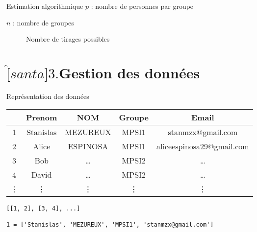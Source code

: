 \documentclass[10pt, compress]{beamer}
\begin{document}
  \begin{frame}{Estimation algorithmique}
    $p$ : nombre de personnes par groupe 
    
    $n$ : nombre de groupes
    \begin{figure}
      \caption{Nombre de tirages possibles}
    \end{figure}
  \end{frame}

\section{$\hat[santa]{\text{3.}}$\quad Gestion des données}

  \begin{frame}[fragile]{Représentation des données}
    \begin{table}
      \begin{tabular}{ccccc}
          \hline
          & Prenom & NOM & Groupe & Email\\
          \hline
          1 & Stanislas & MEZUREUX & MPSI1 & stanmzx@gmail.com \\
          2 & Alice & ESPINOSA & MPSI1 & aliceespinosa29@gmail.com \\
          3 & Bob & \ldots & MPSI2 & \ldots \\
          4 & David & \ldots & MPSI2 & \ldots \\
          \vdots & \vdots & \vdots & \vdots & \vdots \\
          \hline
      \end{tabular}
    \end{table}
    \begin{longlisting}
      \caption{Format des données manipulées}
      \begin{verbatim}
[[1, 2], [3, 4], ...]

1 = ['Stanislas', 'MEZUREUX', 'MPSI1', 'stanmzx@gmail.com']
      \end{verbatim}
    \end{longlisting}
  \end{frame}
\end{document}
